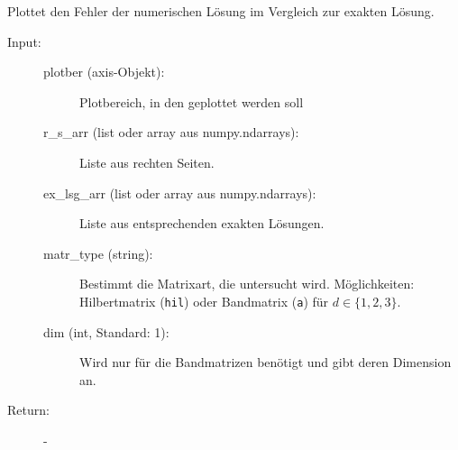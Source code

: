\documentclass[letterpaper,10pt,ngerman, oneside, openright]{sphinxmanual}
\begin{document}

\begin{fulllineitems}
\label{\detokenize{index:aufg_3_4_main.plot_fehl}}
Plottet den Fehler der numerischen Lösung im Vergleich zur exakten Lösung.
\begin{description}
\item[{Input:}] \leavevmode\begin{description}
\item[{plotber (axis-Objekt):}] \leavevmode
Plotbereich, in den geplottet werden soll

\item[{r\_s\_arr (list oder array aus numpy.ndarrays):}] \leavevmode
Liste aus rechten Seiten.

\item[{ex\_lsg\_arr (list oder array aus numpy.ndarrays):}] \leavevmode
Liste aus entsprechenden exakten Lösungen.

\item[{matr\_type (string):}] \leavevmode
Bestimmt die Matrixart, die untersucht wird.
Möglichkeiten: Hilbertmatrix (\texttt{hil}) oder
Bandmatrix (\texttt{a}) für $d\in\{1,2,3\}$.

\item[{dim (int, Standard: 1):}] \leavevmode
Wird nur für die Bandmatrizen benötigt und gibt deren Dimension an.

\end{description}

\end{description}
\begin{description}
\item [{Return:}] -
\end{description}
\end{fulllineitems}

\end{document}
